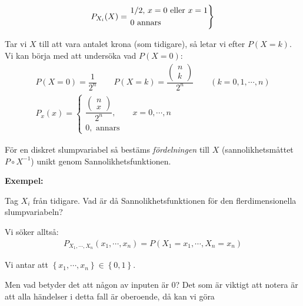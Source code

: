 \begin{equation*}
  \begin{gathered}
    P_{X_i}(X)=
    \begin{rcases*}
      1/2\text{, $x=0$ eller $x=1$}\\
      0\text{ annars}
    \end{rcases*}
  \end{gathered}
\end{equation*}
\par\bigskip
\noindent Tar vi $X$ till att vara antalet krona (som tidigare), så letar vi efter $P(X=k)$. Vi kan börja med att undersöka vad $P(X=0)$:
\begin{equation*}
  \begin{gathered}
    P(X=0)=\dfrac{1}{2^n}\qquad P(X=k) = \dfrac{\begin{pmatrix}n\\k\end{pmatrix}}{2^n}\qquad (k=0,1,\cdots, n)\\
    P_x(x) = 
    \begin{cases*}
      \dfrac{\begin{pmatrix}n\\x\end{pmatrix}}{2^n},\qquad x= 0,\cdots,n\\
      0,\text{ annars}
    \end{cases*}
  \end{gathered}
\end{equation*}
\par\bigskip
\noindent För en diskret slumpvariabel så bestäms \textit{fördelningen} till $X$ (sannolikhetsmåttet $P\circ X^{-1}$) unikt genom Sannolikhetsfunktionen.
\par\bigskip
\noindent\textbf{Exempel:}\par
\noindent Tag $X_i$ från tidigare. Vad är då Sannolikhetsfunktionen för den flerdimensionella slumpvariabeln?\par
\noindent Vi söker alltså:
\begin{equation*}
  \begin{gathered}
    P_{X_1,\cdots,X_n}(x_1,\cdots,x_n) = P(X_1=x_1,\cdots,X_n=x_n)
  \end{gathered}
\end{equation*}\par
\noindent Vi antar att $\left\{x_1,\cdots,x_n\right\}\in\left\{0,1\right\}$. \par
\noindent Men vad betyder det att någon av inputen är 0? Det som är viktigt att notera är att alla händelser i detta fall är oberoende, då kan vi göra
